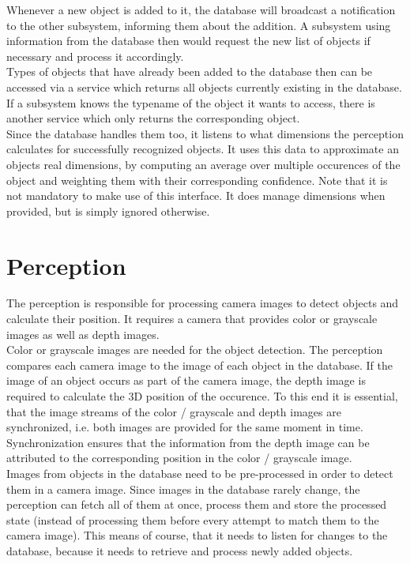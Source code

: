 Whenever a new object is added to it, the database will broadcast a notification to the other subsystem, informing them about the addition. A subsystem using information from the database then would request the new list of objects if necessary and process it accordingly. \\

Types of objects that have already been added to the database then can be accessed via a service which returns all objects currently existing in the database. If a subsystem knows the typename of the object it wants to access, there is another service which only returns the corresponding object. \\

Since the database handles them too, it listens to what dimensions the perception calculates for successfully recognized objects. It uses this data to approximate an objects real dimensions, by computing an average over multiple occurences of the object and weighting them with their corresponding confidence. Note that it is not mandatory to make use of this interface. It does manage dimensions when provided, but is simply ignored otherwise.

\section{Perception} %
The perception is responsible for processing camera images to detect objects and calculate their position. It requires a camera that provides color or grayscale images as well as depth images. \\

Color or grayscale images are needed for the object detection. The perception compares each camera image to the image of each object in the database. If the image of an object occurs as part of the camera image, the depth image is required to calculate the 3D position of the occurence. To this end it is essential, that the image streams of the color / grayscale and depth images are synchronized, i.e. both images are provided for the same moment in time. Synchronization ensures that the information from the depth image can be attributed to the corresponding position in the color / grayscale image. \\

Images from objects in the database need to be pre-processed in order to detect them in a camera image. Since images in the database rarely change, the perception can fetch all of them at once, process them and store the processed state (instead of processing them before every attempt to match them to the camera image). This means of course, that it needs to listen for changes to the database, because it needs to retrieve and process newly added objects. \\

